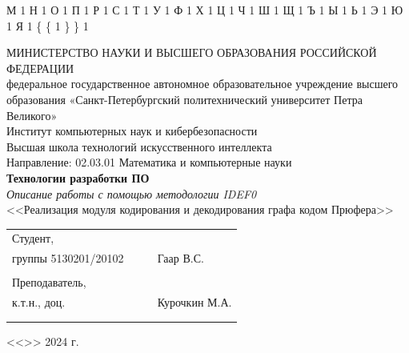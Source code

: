 \documentclass[a4paper, final]{article}
\begin{document}
{  {М}{ {\selectfont{}} }1
  {Н}{ {\selectfont{}} }1
  {О}{ {\selectfont{}} }1
  {П}{ {\selectfont{}} }1
  {Р}{ {\selectfont{}} }1
  {С}{ {\selectfont{}} }1
  {Т}{ {\selectfont{}} }1
  {У}{ {\selectfont{}} }1
  {Ф}{ {\selectfont{}} }1
  {Х}{ {\selectfont{}} }1
  {Ц}{ {\selectfont{}} }1
  {Ч}{ {\selectfont{}} }1
  {Ш}{ {\selectfont{}} }1
  {Щ}{ {\selectfont{}} }1
  {Ъ}{ {\selectfont{}} }1
  {Ы}{ {\selectfont{}} }1
  {Ь}{ {\selectfont{}} }1
  {Э}{ {\selectfont{}} }1
  {Ю}{ {\selectfont{}} }1
  {Я}{ {\selectfont{}} }1
  {\{}{ { {\color{brackets}\{} } }1 %
  {\} }{ { {\color{brackets}\} } } }1 %
}

\begin{center}
\hfill \break
\hfill \break
\normalsize{МИНИСТЕРСТВО НАУКИ И ВЫСШЕГО ОБРАЗОВАНИЯ РОССИЙСКОЙ ФЕДЕРАЦИИ\\
 федеральное государственное автономное образовательное учреждение высшего образования «Санкт-Петербургский политехнический университет Петра Великого»\\[5pt]}
\normalsize{Институт компьютерных наук и кибербезопасности}\\[5pt] 
\normalsize{Высшая школа технологий искусственного интеллекта}\\[5pt] 
\normalsize{Направление: 02.03.01 Математика и компьютерные науки}\\

\hfill \break
\hfill \break
\hfill \break
\large{\textbf{Технологии разработки ПО}}\\
\hfill \break
\large{\textit{Описание работы с помощью методологии IDEF0}}\\
\large{<<Реализация модуля кодирования и декодирования графа кодом Прюфера>>}

\hfill \break
\hfill \break
\end{center}
 
\small{ 
\begin{tabular}{lrrl}
\!\!\!Студент, & \hspace{2cm} & & \\
\!\!\!группы 5130201/20102 & \hspace{2cm} & \underline{\hspace{3cm}} & Гаар В.С. \\\\
\!\!\!Преподаватель, \hspace{2cm} & & \\
\!\!\!к.т.н., доц. & \hspace{2cm} & \underline{\hspace{3cm}} &  Курочкин М.А. \\\\
&&\hspace{5cm}
\end{tabular}
\begin{flushright}
<<\underline{\hspace{1cm}}>>\underline{\hspace{2.5cm}} 2024 г.
\end{flushright}
}
\end{document}
